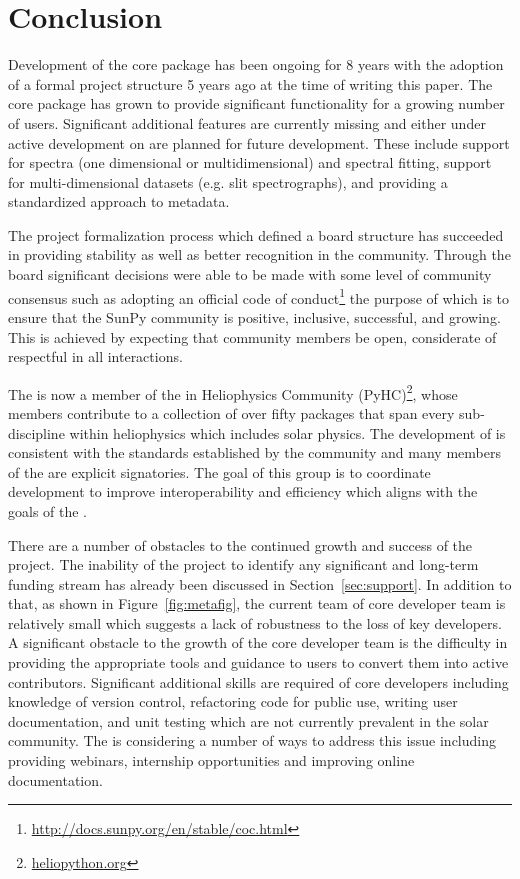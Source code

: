 \section{Conclusion}
\label{sec:conclusion}

Development of the \sunpypkg core package has been ongoing for 8 years with the adoption of a formal project structure 5 years ago at the time of writing this paper.
The core package has grown to provide significant functionality for a growing number of users.
Significant additional features are currently missing and either under active development on are planned for future development.
These include support for spectra (one dimensional or multidimensional) and spectral fitting, support for multi-dimensional datasets (e.g. slit spectrographs), and providing a standardized approach to metadata.

The project formalization process which defined a board structure has succeeded in providing stability as well as better recognition in the community.
Through the board significant decisions were able to be made with some level of community consensus such as adopting an official code of conduct\footnote{\url{http://docs.sunpy.org/en/stable/coc.html}} the purpose of which is to ensure that the SunPy community is positive, inclusive, successful, and growing.
This is achieved by expecting that community members be open, considerate of respectful in all interactions.

The \sunpyproj is now a member of the \python in Heliophysics Community (PyHC)\footnote{\url{heliopython.org}}, whose members contribute to a collection of over fifty \python packages that span every sub-discipline within heliophysics which includes solar physics.
The development of \sunpypkg is consistent with the standards established by the community \citep{pyhcStandards} and many members of the \sunpyproj are explicit signatories.
The goal of this group is to coordinate \python development to improve interoperability and efficiency which aligns with the goals of the \sunpyproj.

There are a number of obstacles to the continued growth and success of the project. The inability of the project to identify any significant and long-term funding stream has already been discussed in Section~\ref{sec:support}.
In addition to that, as shown in Figure~\ref{fig:metafig}, the current team of core developer team is relatively small which suggests a lack of robustness to the loss of key developers.
A significant obstacle to the growth of the core developer team is the difficulty in providing the appropriate tools and guidance to users to convert them into active contributors.
Significant additional skills are required of core developers including knowledge of version control, refactoring code for public use, writing user documentation, and unit testing which are not currently prevalent in the solar community.
The \sunpyproj is considering a number of ways to address this issue including providing webinars, internship opportunities and improving online documentation.
